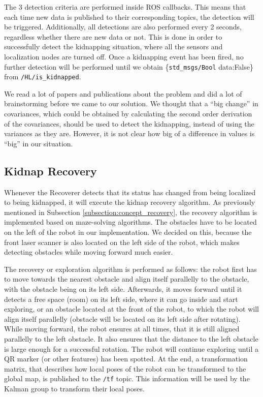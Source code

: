 The 3 detection criteria are performed inside ROS callbacks. This means that each time new data is published to their corresponding topics, the detection will be triggered. Additionally, all detections are also performed every 2 seconds, regardless whether there are new data or not. This is done in order to successfully detect the kidnapping situation, where all the sensors and localization nodes are turned off. Once a kidnapping event has been fired, no further detection will be performed until we obtain \{\texttt{std\_msgs/Bool} data:False\} from \texttt{/HL/is\_kidnapped}.

We read a lot of papers and publications about the problem and did a lot of brainstorming before we came to our solution. We thought that a ``big change'' in covariances, which could be obtained by calculating the second order derivation of the covariances, should be used to detect the kidnapping, instead of using the variances as they are. However, it is not clear how big of a difference in values is ``big'' in our situation.


\subsection{Kidnap Recovery} \label{subsection:implementation_recovery}

Whenever the Recoverer detects that its status has changed from being localized to being kidnapped, it will execute the kidnap recovery algorithm. As previously mentioned in Subsection \ref{subsection:concept_recovery}, the recovery algorithm is implemented based on maze-solving algorithms. The obstacles have to be located on the left of the robot in our implementation. We decided on this, because the front laser scanner is also located on the left side of the robot, which makes detecting obstacles while moving forward much easier.

The recovery or exploration algorithm is performed as follows: the robot first has to move towards the nearest obstacle and align itself parallelly to the obstacle, with the obstacle being on its left side. Afterwards, it moves forward until it detects a free space (room) on its left side, where it can go inside and start exploring, or an obstacle located at the front of the robot, to which the robot will align itself parallelly (obstacle will be located on its left side after rotating). While moving forward, the robot ensures at all times, that it is still aligned parallelly to the left obstacle. It also ensures that the distance to the left obstacle is large enough for a successful rotation. The robot will continue exploring until a QR marker (or other features) has been spotted. At the end, a transformation matrix, that describes how local poses of the robot can be transformed to the global map, is published to the \texttt{/tf} topic. This information will be used by the Kalman group to transform their local poses.

